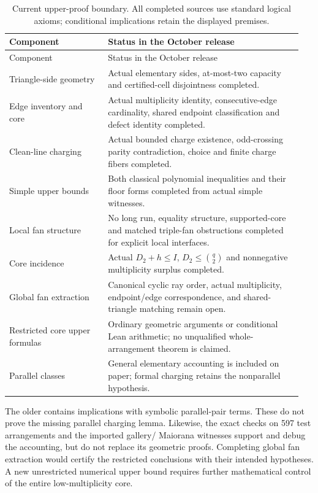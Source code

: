 \begin{longtable}{@{}P{0.32\linewidth}P{0.63\linewidth}@{}}
\caption{Current upper-proof boundary. All completed sources use standard
logical axioms; conditional implications retain the displayed premises.}
\label{upper:formal-status}\\
\toprule Component & Status in the October release\\\midrule\endfirsthead
\toprule Component & Status in the October release\\\midrule\endhead
\bottomrule\endfoot
Triangle-side geometry & Actual elementary sides, at-most-two capacity and
certified-cell disjointness completed.\\
Edge inventory and core & Actual multiplicity identity, consecutive-edge
cardinality, shared endpoint classification and defect identity completed.\\
Clean-line charging & Actual bounded charge existence, odd-crossing parity
contradiction, choice and finite charge fibers completed.\\
Simple upper bounds & Both classical polynomial inequalities and their floor
forms completed from actual simple witnesses.\\
Local fan structure & No long run, equality structure, supported-core and
matched triple-fan obstructions completed for explicit local interfaces.\\
Core incidence & Actual $D_2+h\le I$, $D_2\le\binom q2$ and nonnegative
multiplicity surplus completed.\\
Global fan extraction & Canonical cyclic ray order, actual multiplicity,
endpoint/edge correspondence, and shared-triangle matching remain open.\\
Restricted core upper formulas & Ordinary geometric arguments or conditional
Lean arithmetic; no unqualified whole-arrangement theorem is claimed.\\
Parallel classes & General elementary accounting is included on paper;
formal charging retains the nonparallel hypothesis.\\
\end{longtable}

The older  contains implications with symbolic
parallel-pair terms. These do not prove the missing parallel charging
lemma. Likewise, the exact checks on 597 test arrangements and the
imported gallery/ Maiorana witnesses support and debug the accounting,
but do not replace its geometric proofs. Completing global fan
extraction would certify the restricted conclusions with their intended
hypotheses. A new unrestricted numerical upper bound requires further
mathematical control of the entire low-multiplicity core.
